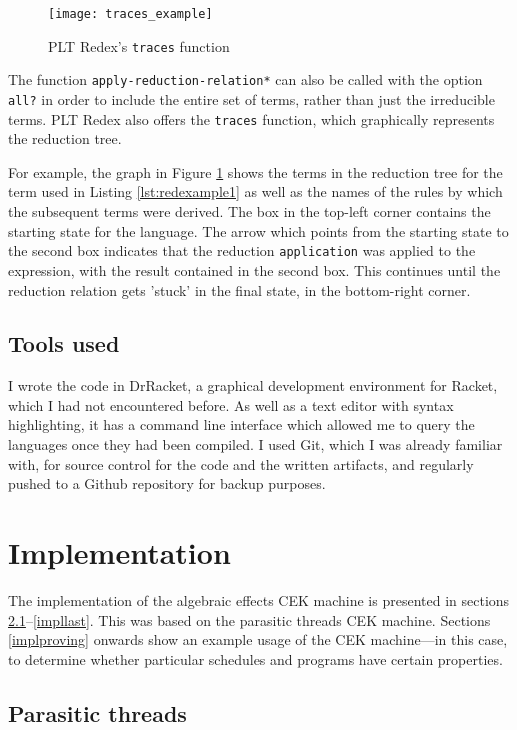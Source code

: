 \documentclass[12pt,a4paper,twoside,openright]{report}
\begin{document}
\begin{figure}
\centering
\caption{PLT Redex's \texttt{traces} function}
\label{fig:traces_example}
\texttt{[image: traces\_example]}
\end{figure}

The function \texttt{apply-reduction-relation*} can also be called with the option \texttt{all?} in order to include the entire set of terms, rather than just the irreducible terms. PLT Redex also offers the \texttt{traces} function, which graphically represents the reduction tree.

For example, the graph in Figure \ref{fig:traces_example} shows the terms in the reduction tree for the term used in Listing \ref{lst:redexample1} as well as the names of the rules by which the subsequent terms were derived. The box in the top-left corner contains the starting state for the language. The arrow which points from the starting state to the second box indicates that the reduction \texttt{application} was applied to the expression, with the result contained in the second box. This continues until the reduction relation gets 'stuck' in the final state, in the bottom-right corner.

\section{Tools used}

I wrote the code in DrRacket, a graphical development environment for Racket, which I had not encountered before. As well as a text editor with syntax highlighting, it has a command line interface which allowed me to query the languages once they had been compiled. I used Git, which I was already familiar with, for source control for the code and the written artifacts, and regularly pushed to a Github repository for backup purposes.

\chapter{Implementation}

The implementation of the algebraic effects CEK machine is presented in sections \ref{implfirst}--\ref{impllast}. This was based on the parasitic threads CEK machine. Sections \ref{implproving} onwards show an example usage of the CEK machine---in this case, to determine whether particular schedules and programs have certain properties.

\section{Parasitic threads}\label{implfirst}
\end{document}
